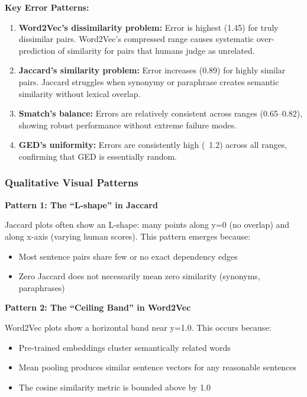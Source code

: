 \documentclass[11pt,a4paper]{article}
\begin{document}
\textbf{Key Error Patterns:}

\begin{enumerate}
    \item \textbf{Word2Vec's dissimilarity problem:} Error is highest (1.45) for truly dissimilar pairs. Word2Vec's compressed range causes systematic over-prediction of similarity for pairs that humans judge as unrelated.
    
    \item \textbf{Jaccard's similarity problem:} Error increases (0.89) for highly similar pairs. Jaccard struggles when synonymy or paraphrase creates semantic similarity without lexical overlap.
    
    \item \textbf{Smatch's balance:} Errors are relatively consistent across ranges (0.65--0.82), showing robust performance without extreme failure modes.
    
    \item \textbf{GED's uniformity:} Errors are consistently high (~1.2) across all ranges, confirming that GED is essentially random.
\end{enumerate}

\subsubsection{Qualitative Visual Patterns}

\textbf{Pattern 1: The ``L-shape'' in Jaccard}

Jaccard plots often show an L-shape: many points along y=0 (no overlap) and along x-axis (varying human scores). This pattern emerges because:
\begin{itemize}
    \item Most sentence pairs share few or no exact dependency edges
    \item Zero Jaccard does not necessarily mean zero similarity (synonyms, paraphrases)
\end{itemize}

\textbf{Pattern 2: The ``Ceiling Band'' in Word2Vec}

Word2Vec plots show a horizontal band near y=1.0. This occurs because:
\begin{itemize}
    \item Pre-trained embeddings cluster semantically related words
    \item Mean pooling produces similar sentence vectors for any reasonable sentences
    \item The cosine similarity metric is bounded above by 1.0
\end{itemize}
\end{document}
